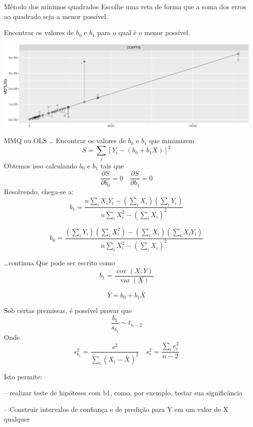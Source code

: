\documentclass[
  9pt,
  ignorenonframetext,
  aspectratio=169]{beamer}
\begin{document}
\begin{frame}{Método dos mínimos quadrados}
\protect\hypertarget{muxe9todo-dos-muxednimos-quadrados}{}
Escolhe uma reta de forma que a soma dos erros ao quadrado seja a menor
possível.

Encontrar os valores de \(b_0\) e \(b_1\) para o qual é o menor
possível.

\includegraphics{aula_12_files/figure-beamer/unnamed-chunk-5-1.pdf}
\end{frame}

\begin{frame}{MMQ ou OLS \ldots{}}
\protect\hypertarget{mmq-ou-ols}{}
Encontrar os valores de \(b_0\) e \(b_1\) que minimizem \[
S=\sum_{i}\left[Y_{i}-\left(b_{0}+b_{1} X\right)\right]^{2}
\] Obtemos isso calculando \(b_0\) e \(b_1\) tais que \[
\frac{\partial S}{\partial b_{0}}=0 \quad \frac{\partial S}{\partial b_{1}}=0
\] Resolvendo, chega-se a: \[
b_{1}=\frac{n \sum_{i} X_{i} Y_{i}-\left(\sum_{i} X_{i}\right)\left(\sum_{i} Y_{i}\right)}{n \sum_{i} X_{i}^{2}-\left(\sum_{i} X_{i}\right)^{2}}
\]

\[
b_{0}=\frac{\left(\sum_{i} Y_{i}\right)\left(\sum_{i} X_{i}^{2}\right)-\left(\sum_{i} X_{i}\right)\left(\sum_{i} X_{i} Y_{i}\right)}{n \sum_{i} X_{i}^{2}-\left(\sum_{i} X_{i}\right)^{2}}
\]
\end{frame}

\begin{frame}{\ldots continua}
\protect\hypertarget{continua}{}
Que pode ser escrito como \[
b_{1}=\frac{\operatorname{cov}(X, Y)}{\operatorname{var}(X)}
\]

\[
\bar{Y}=b_{0}+b_{1} \bar{X}
\]
\end{frame}

\begin{frame}{Sob certas premissas, é possível provar que}
\protect\hypertarget{sob-certas-premissas-uxe9-possuxedvel-provar-que}{}
\[
\frac{b_{1}}{s_{b_{1}}} \sim t_{n-2}
\] Onde \[
s_{b_{1}}^{2}=\frac{s^{2}}{\sum_{i}\left(X_{i}-\bar{X}\right)^{2}} \quad s_{e}^{2}=\frac{\sum_{i} e_{i}^{2}}{n-2}
\]

Isto permite:

-- realizar teste de hipóteses com b1, como, por exemplo, testar sua
significância

-- Construir intervalos de confiança e de predição para Y em um valor de
X qualquer
\end{frame}
\end{document}

